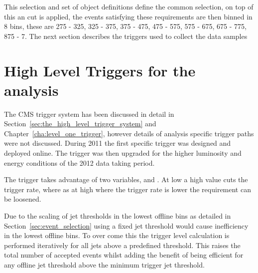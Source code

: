 This selection and set of object definitions define the common selection, on 
top of this an \alt cut is applied, the events satisfying these requirements 
are then binned in 8 \HT bins, these are \unit{275}{\GeV} - \unit{325}{\GeV}, 
\unit{325}{\GeV} - \unit{375}{\GeV}, \unit{375}{\GeV} - \unit{475}{\GeV}, 
\unit{475}{\GeV} - \unit{575}{\GeV}, \unit{575}{\GeV} - \unit{675}{\GeV}, 
\unit{675}{\GeV} - \unit{775}{\GeV}, \unit{875}{\GeV} - \unit{7}{\TeV}.
The next section describes the triggers used to collect the data samples

\section{High Level Triggers for the \alt analysis} %
\label{sec:high_level_triggers_for_the_alt_analysis}
The CMS trigger system has been discussed in detail in 
Section~\ref{sec:the_high_level_trigger_system} and 
Chapter~\ref{cha:level_one_trigger}, however details of analysis specific 
trigger paths were not discussed. During 2011 the first \alt specific trigger 
was designed and deployed online. The trigger was then upgraded for the higher 
luminosity and energy conditions of the 2012 data taking period.


The trigger takes advantage of two variables, \HT and \alt. At low 
\HT a high \alt value cuts the trigger rate, where as at high \HT where the
trigger rate is lower the \alt requirement can be loosened.

Due to the scaling of jet thresholds in the lowest offline \HT bins as detailed 
in Section~\ref{sec:event_selection} using a fixed jet threshold would cause 
inefficiency in the lowest offline \HT bins. To over come this the trigger 
level \alt calculation is performed iteratively for all jets above a predefined 
threshold. This raises the total number of accepted events whilst adding the 
benefit of being efficient for any offline jet threshold above the minimum 
trigger jet threshold.

